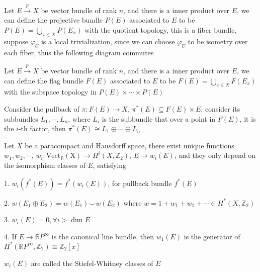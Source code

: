 \documentclass[main]{subfiles}
\begin{document}
\begin{definition}
Let $E\xrightarrow{p}X$ be vector bundle of rank $n$, and there is a inner product over $E$, we can define the projective bundle $P(E)$ associated to $E$ to be $P(E)=\displaystyle\bigcup_{x\in X}P(E_x)$ with the quotient topology, this is a fiber bundle, suppose $\varphi_U$ is a local trivialization, since we can choose $\varphi_U$ to be isometry over each fiber, thus the following diagram commutes \par
\begin{center}
\end{center}
\end{definition}

\begin{definition}
Let $E\xrightarrow{p}X$ be vector bundle of rank $n$, and there is a inner product over $E$, we can define the flag bundle $F(E)$ associated to $E$ to be $F(E)=\displaystyle\bigcup_{x\in X}F(E_x)$ with the subspace topology in $P(E)\times\cdots\times P(E)$
\end{definition}

\begin{remark}
Consider the pullback of $\pi:F(E)\to X$, $\pi^*(E)\subseteq F(E)\times 
E$, consider its subbundles $L_1,\cdots,L_n$, where $L_i$ is the subbundle that over a point in $F(E)$, it is the $i$-th factor, then $\pi^*(E)\cong L_1\oplus\cdots\oplus L_n$
\end{remark}

\begin{definition}
Let $X$ be a paracompact and Hausdorff space, there exist unique functions $w_1,w_2,\cdots$, $w_i: \mathrm{Vect_{\mathbb R}(X)}\to H^i(X,\mathbb Z_2)$, $E\to w_i(E)$, and they only depend on the isomorphism classes of $E$, satisfying \par
1. $w_i(f^*(E))=f^*(w_i(E))$, for pullback bundle $f^*(E)$ \par
2. $w(E_1\oplus E_2)=w(E_1)\smile w(E_2)$ where $w=1+w_1+w_2+\cdots\in H^*(X,\mathbb Z_2)$ \par
3. $w_i(E)=0,\forall i>\dim E$ \par
4. If $E\to \mathbb RP^\infty$ is the canonical line bundle, then $w_1(E)$ is the generator of $H^*(\mathbb RP^\infty,\mathbb Z_2)\cong\mathbb Z_2[x]$ \par
$w_i(E)$ are called the Stiefel-Whitney classes of $E$
\end{definition}
\end{document}
